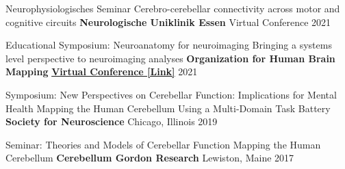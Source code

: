 \begin{cventries}

  \cventry
    {Neurophysiologisches Seminar} %
    {Cerebro-cerebellar connectivity across motor and cognitive circuits} %
    {\textbf{Neurologische Uniklinik Essen}} %
    {Virtual Conference} %
    {2021} %

  \cventry
    {Educational Symposium: Neuroanatomy for neuroimaging} %
    {Bringing a systems level perspective to neuroimaging analyses} %
    {\textbf{Organization for Human Brain Mapping}} %
    { \href{https://www.youtube.com/watch?v=L6nwkvBqJzI}{\textbf{Virtual Conference [Link]}}} %
    {2021} %
    

  \cventry
    {Symposium: New Perspectives on Cerebellar Function: Implications for Mental Health} %
    {Mapping the Human Cerebellum Using a Multi-Domain Task Battery} %
    {\textbf{Society for Neuroscience}} %
    {Chicago, Illinois} %
    {2019} %
    
    
  \cventry
    {Seminar: Theories and Models of Cerebellar Function} %
    {Mapping the Human Cerebellum} %
    {\textbf{Cerebellum Gordon Research}} %
    {Lewiston, Maine} %
    {2017} %
   
\end{cventries}


